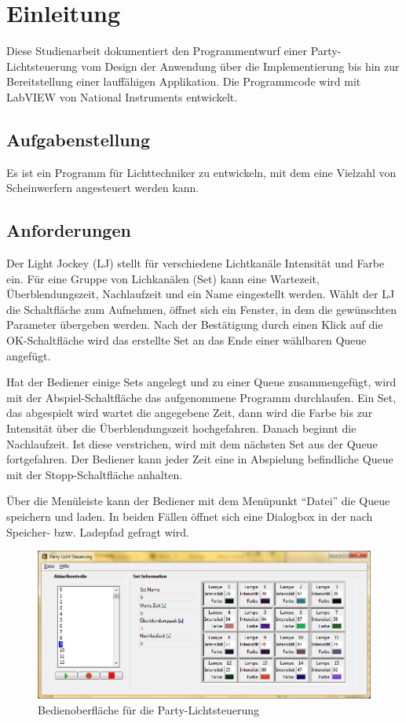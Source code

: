 \section{Einleitung}%

Diese Studienarbeit dokumentiert den Programmentwurf einer Party-Lichtsteuerung vom Design der Anwendung über die Implementierung bis hin zur Bereitstellung einer lauffähigen Applikation.
Die Programmcode wird mit LabVIEW von National Instruments entwickelt.

\subsection{Aufgabenstellung}
Es ist ein Programm für Lichttechniker zu entwickeln, mit dem eine Vielzahl von Scheinwerfern angesteuert werden kann. 

\subsection{Anforderungen}
Der Light Jockey (LJ) stellt für verschiedene Lichtkanäle Intensität und Farbe ein. 
Für eine Gruppe von Lichkanälen (Set) kann eine Wartezeit, Überblendungszeit, Nachlaufzeit und ein Name eingestellt werden. 
Wählt der LJ die Schaltfläche zum Aufnehmen, öffnet sich ein Fenster, in dem die gewünschten Parameter übergeben werden. 
Nach der Bestätigung durch einen Klick auf die OK-Schaltfläche wird das erstellte Set an das Ende einer wählbaren Queue angefügt.

Hat der Bediener einige Sets angelegt und zu einer Queue zusammengefügt, wird mit der Abspiel-Schaltfläche das aufgenommene Programm durchlaufen. 
Ein Set, das abgespielt wird wartet die angegebene Zeit, dann wird die Farbe bis zur Intensität über die Überblendungszeit hochgefahren. 
Danach beginnt die Nachlaufzeit.
Ist diese verstrichen, wird mit dem nächsten Set aus der Queue fortgefahren. 
Der Bediener kann jeder Zeit eine in Abspielung befindliche Queue mit der Stopp-Schaltfläche anhalten.

Über die Menüleiste kann der Bediener mit dem Menüpunkt "`Datei"' die Queue speichern und laden. 
In beiden Fällen öffnet sich eine Dialogbox in der nach Speicher- bzw. Ladepfad gefragt wird.

	\begin{figure}%
	\centering
		\includegraphics[width=\textwidth]{Pics/Oberflaeche001.png}
	\caption{Bedienoberfläche für die Party-Lichtsteuerung}
	\label{fig:ober001}
	\end{figure}



